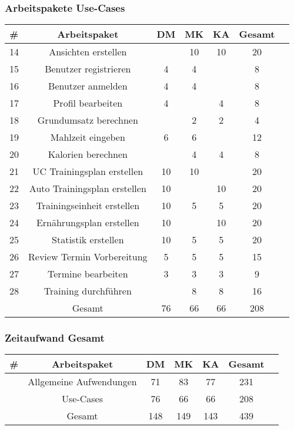 \documentclass[12pt,a4paper,onecolumn]{article}
\begin{document}
\subsubsection{Arbeitspakete Use-Cases}
\begin{tabular}{|l|c|c|c|c|c|c|}
\hline
      \textbf{\#} & \textbf{Arbeitspaket} & \textbf{DM} & \textbf{MK} & \textbf{KA} & \textbf{Gesamt} \\



\hline
14 & Ansichten erstellen & & 10 &  10 & 20\\
\hline
15 & Benutzer registrieren & 4 & 4  & & 8\\
\hline
16 & Benutzer anmelden & 4 & 4 &   & 8\\
\hline
17 & Profil bearbeiten & 4 & & 4 & 8\\
\hline
18 & Grundumsatz berechnen &  & 2 &  2 & 4\\
\hline
19 & Mahlzeit eingeben &6 & 6 &   & 12\\
\hline
20 & Kalorien berechnen & & 4 &  4 & 8\\
\hline
21 & UC Trainingsplan erstellen & 10& 10 &   & 20\\
\hline
22 & Auto Trainingsplan erstellen & 10 &   &10 & 20\\
\hline
23 & Trainingseinheit erstellen & 10 & 5   & 5 & 20\\
\hline
24 & Ernährungsplan erstellen &10 &  &  10 & 20 \\
\hline
25 & Statistik erstellen & 10 &5   & 5& 20\\
\hline
26 & Review Termin Vorbereitung & 5 & 5&  5 & 15\\
\hline
27 & Termine bearbeiten & 3& 3 & 3 & 9\\
\hline
28 & Training durchführen & & 8 & 8 & 16\\
\hline
\hline
 & Gesamt & 76 & 66 & 66 &  208\\
\hline
\end{tabular}

\subsubsection{Zeitaufwand Gesamt}

\begin{tabular}{|l|c|c|c|c|c|c|}
\hline
      \textbf{\#} & \textbf{Arbeitspaket} & \textbf{DM} & \textbf{MK} & \textbf{KA} & \textbf{Gesamt} \\
\hline
 & Allgemeine Aufwendungen & 71 & 83  & 77 & 231\\
\hline
 & Use-Cases & 76 & 66 & 66 & 208\\


\hline
\hline
 & Gesamt & 148 & 149 & 143 & 439\\
\hline

\end{tabular}
\end{document}
